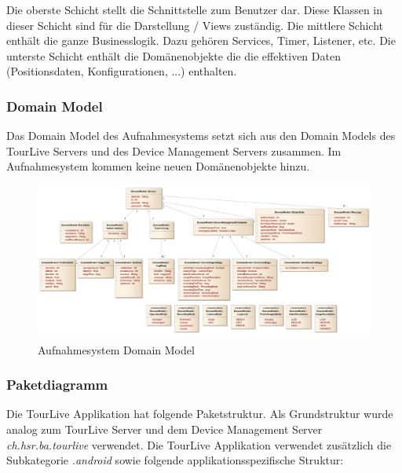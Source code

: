 Die oberste Schicht stellt die Schnittstelle zum Benutzer dar. Diese Klassen in dieser Schicht sind für die Darstellung / Views zuständig. Die mittlere Schicht enthält die ganze Businesslogik. Dazu gehören Services, Timer, Listener, etc. Die unterste Schicht enthält die Domänenobjekte die die effektiven Daten (Positionsdaten, Konfigurationen, ...) enthalten. 

\subsubsection{Domain Model}
Das Domain Model des Aufnahmesystems setzt sich aus den Domain Models des TourLive Servers und des Device Management Servers zusammen. Im Aufnahmesystem kommen keine neuen Domänenobjekte hinzu.

\begin{figure}[H]
\centering
\includegraphics[width=150mm]{images/android/domainmodel.jpg}
\caption{Aufnahmesystem Domain Model}
\end{figure}

\subsubsection{Paketdiagramm}
Die TourLive Applikation hat folgende Paketstruktur. Als Grundstruktur wurde analog zum TourLive Server und dem Device Management Server \textit{ch.hsr.ba.tourlive} verwendet. Die TourLive Applikation verwendet zusätzlich die Subkategorie \textit{.android} sowie folgende applikationsspezifische Struktur:

